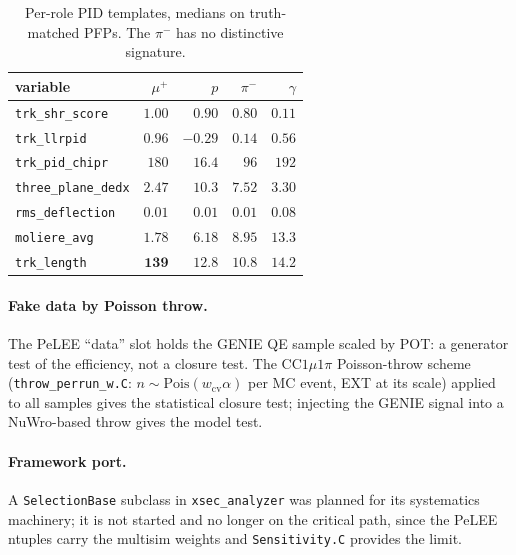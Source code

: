\documentclass[11pt,a4paper]{article}
\begin{document}
\begin{table}[h]\centering\small
\begin{tabular}{lrrrr}
\toprule
variable & $\mu^+$ & $p$ & $\pi^-$ & $\gamma$ \\
\midrule
\texttt{trk\_shr\_score}    & $1.00$  & $0.90$  & $0.80$  & $\mathbf{0.11}$ \\
\texttt{trk\_llrpid}        & $\mathbf{0.96}$ & $-0.29$ & $0.14$ & $0.56$ \\
\texttt{trk\_pid\_chipr}    & $180$   & $\mathbf{16.4}$ & $96$ & $192$ \\
\texttt{three\_plane\_dedx} & $2.47$  & $\mathbf{10.3}$ & $7.52$ & $3.30$ \\
\texttt{rms\_deflection}    & $0.01$  & $0.01$  & $0.01$  & $\mathbf{0.08}$ \\
\texttt{moliere\_avg}       & $1.78$  & $6.18$  & $8.95$  & $\mathbf{13.3}$ \\
\texttt{trk\_length}        & $\mathbf{139}$ & $12.8$ & $10.8$ & $14.2$ \\
\bottomrule
\end{tabular}
\caption{Per-role PID templates, medians on truth-matched PFPs. The $\pi^-$ has no
distinctive signature.}
\label{tab:templates}
\end{table}

\paragraph{Fake data by Poisson throw.} The PeLEE ``data'' slot holds the GENIE QE sample
scaled by POT: a generator test of the efficiency, not a closure test. The CC$1\mu1\pi$
Poisson-throw scheme (\texttt{throw\_perrun\_w.C}: $n\sim\mathrm{Pois}(w_{\mathrm{cv}}
\alpha)$ per MC event, EXT at its scale) applied to all samples gives the statistical
closure test; injecting the GENIE signal into a NuWro-based throw gives the model test.

\paragraph{Framework port.} A \texttt{SelectionBase} subclass in \texttt{xsec\_analyzer}
was planned for its systematics machinery; it is not started and no longer on the critical
path, since the PeLEE ntuples carry the multisim weights and \texttt{Sensitivity.C}
provides the limit.

\end{document}
